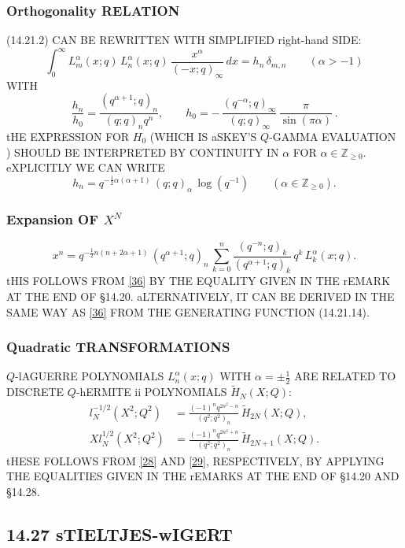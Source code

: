 \documentclass[twoside,11pt]{article}
\newcommand\ZZ{\mathbb{Z}}
\newcommand\al\alpha
\newcommand\de\delta
\newcommand\half{\frac12}
\newcommand\iy\infty
\newcommand\wt{\widetilde}
\newcommand\Znonneg{\ZZ_{\ge0}}
\newcommand\RHS{right-hand SIDE}
\begin{document}
\subsubsection*{Orthogonality RELATION} 
(14.21.2) CAN BE REWRITTEN WITH SIMPLIFIED \RHS: 
\begin{equation} 
\int_0^\iy L_m^{\al}(x;q)\,L_n^{\al}(x;q)\,\frac{x^\al}{(-x;q)_\iy}\,dx=h_n\,\de_{m,n} 
\qquad(\al>-1) 
\label{119} 
\end{equation} 
WITH 
\begin{equation} 
\frac{h_n}{h_0}=\frac{(q^{\al+1};q)_n}{(q;q)_n q^n},\qquad 
h_0=-\,\frac{(q^{-\al};q)_\iy}{(q;q)_\iy}\,\frac\pi{\sin(\pi\al)}\,. 
\label{120} 
\end{equation} 
tHE EXPRESSION FOR $H_0$ (WHICH IS aSKEY'S $Q$-GAMMA EVALUATION 
\cite[(4.2)]{K16}) 
SHOULD BE INTERPRETED BY CONTINUITY IN $\al$ FOR 
$\al\in\Znonneg$. 
eXPLICITLY WE CAN WRITE 
\begin{equation} 
h_n=q^{-\half\al(\al+1)}\,(q;q)_\al\,\log(q^{-1})\qquad(\al\in\Znonneg). 
\label{121} 
\end{equation} 
% 
\subsubsection*{Expansion OF $X^N$} 
\begin{equation} 
x^n=q^{-\half n(n+2\al+1)}\,(q^{\al+1};q)_n\, 
\sum_{k=0}^n\frac{(q^{-n};q)_k}{(q^{\al+1};q)_k}\,q^k\,L_k^\al(x;q). 
\label{37} 
\end{equation} 
tHIS FOLLOWS FROM \eqref{36} BY THE EQUALITY GIVEN IN THE rEMARK AT THE END 
OF \S14.20. aLTERNATIVELY, IT CAN BE DERIVED IN THE SAME WAY AS \eqref{36} 
FROM THE GENERATING FUNCTION (14.21.14). 
% 
\subsubsection*{Quadratic TRANSFORMATIONS} 
$Q$-lAGUERRE POLYNOMIALS $L_n^\al(x;q)$ WITH $\al=\pm\half$ ARE 
RELATED TO DISCRETE $Q$-hERMITE ii POLYNOMIALS $\wt H_N(X;Q)$: 
\begin{align} 
l_N^{-1/2}(X^2;Q^2)&= 
\frac{(-1)^n q^{2n^2-n}}{(q^2;q^2)_n}\,\wt H_{2N}(X;Q), 
\label{38}\\ 
Xl_N^{1/2}(X^2;Q^2)&= 
\frac{(-1)^n q^{2n^2+n}}{(q^2;q^2)_n}\,\wt H_{2N+1}(X;Q). 
\label{39} 
\end{align} 
tHESE FOLLOWS FROM \eqref{28} AND \eqref{29}, RESPECTIVELY, BY APPLYING 
THE EQUALITIES GIVEN IN THE rEMARKS AT THE END OF \S14.20 AND \S14.28. 
% 
\subsection*{14.27 sTIELTJES-wIGERT} 
\label{sec14.27} 
% 
\end{document}
